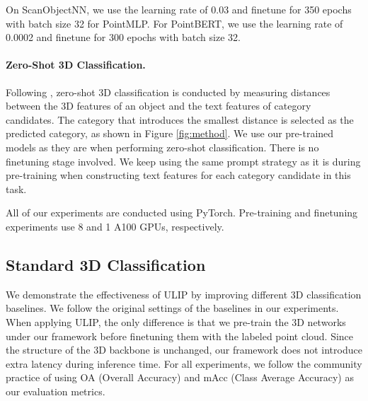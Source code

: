 \documentclass[10pt,twocolumn,letterpaper]{article}
\begin{document}
On ScanObjectNN, we use the learning rate of 0.03 and finetune for 350 epochs with batch size 32 for PointMLP. 
For PointBERT, we use the learning rate of 0.0002 and finetune for 300 epochs with batch size 32.

\vspace{-10pt}
\paragraph{Zero-Shot 3D Classification.} Following \cite{zhang2022pointclip}, zero-shot 3D classification is conducted by measuring distances between the 3D features of an object and the text features of category candidates. The category that introduces the smallest distance is selected as the predicted category, as shown in Figure \ref{fig:method}. We use our pre-trained models as they are when performing zero-shot classification. There is no finetuning stage involved. We keep using the same prompt strategy as it is during pre-training when constructing text features for each category candidate in this task.

All of our experiments are conducted using PyTorch. Pre-training and finetuning experiments use 8 and 1 A100 GPUs, respectively.

\subsection{Standard 3D Classification}
We demonstrate the effectiveness of ULIP by improving different 3D classification baselines. We follow the original settings of the baselines in our experiments. When applying ULIP, the only difference is that we pre-train the 3D networks under our framework before finetuning them with the labeled point cloud. Since the structure of the 3D backbone is unchanged, our framework does not introduce extra latency during inference time.
For all experiments, we follow the community practice of using OA (Overall Accuracy) and mAcc (Class Average Accuracy) as our evaluation metrics.

\end{document}
